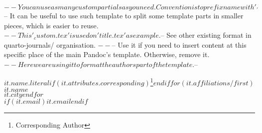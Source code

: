 $-- You can use as many custom partials as you need. Convention is to prefix name with '_'
$-- It can be useful to use such template to split some template parts in smaller pieces, which is easier to reuse. 
$-- This '_custom.tex' is used on 'title.tex' as example.
$-- See other existing format in quarto-journals/ organisation.
$-- %
$-- Use it if you need to insert content at this specific place of the main Pandoc's template. Otherwise, remove it.
$-- Here we are using it to format the authors part of the template.
$-- %

$it.name.literal$$if(it.attributes.corresponding)$\footnote{Corresponding Author}$endif$$for(it.affiliations/first)$\\
$it.name$\\
$it.city$$endfor$\\
$if(it.email)$\href{mailto:$it.email$}{$it.email$}$endif$